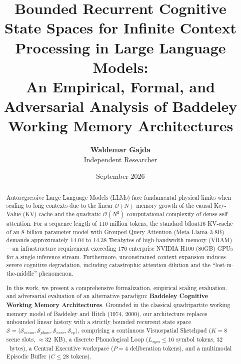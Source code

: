 \documentclass[11pt,a4paper]{article}
\title{\textbf{Bounded Recurrent Cognitive State Spaces for Infinite Context Processing in Large Language Models:\\ An Empirical, Formal, and Adversarial Analysis of Baddeley Working Memory Architectures}}
\author{
    \textbf{Waldemar Gajda} \\
    Independent Researcher
}
\date{September 2026}
\begin{document}
\maketitle

\begin{abstract}
Autoregressive Large Language Models (LLMs) face fundamental physical limits when scaling to long contexts due to the linear $\mathcal{O}(N)$ memory growth of the causal Key-Value (KV) cache and the quadratic $\mathcal{O}(N^2)$ computational complexity of dense self-attention. For a sequence length of 110 million tokens, the standard bfloat16 KV-cache of an 8-billion parameter model with Grouped Query Attention (Meta-Llama-3-8B) demands approximately $14.04$ to $14.38$ Terabytes of high-bandwidth memory (VRAM)---an infrastructure requirement exceeding 176 enterprise NVIDIA H100 (80GB) GPUs for a single inference stream. Furthermore, unconstrained context expansion induces severe cognitive degradation, including catastrophic attention dilution and the ``lost-in-the-middle'' phenomenon.

In this work, we present a comprehensive formalization, empirical scaling evaluation, and adversarial evaluation of an alternative paradigm: \textbf{Baddeley Cognitive Working Memory Architectures}. Grounded in the classical quadripartite working memory model of Baddeley and Hitch (1974, 2000), our architecture replaces unbounded linear history with a strictly bounded recurrent state space $\mathcal{S} = \langle \mathcal{S}_{visuo}, \mathcal{S}_{phon}, \mathcal{S}_{exec}, \mathcal{S}_{ep} \rangle$, comprising a continuous Visuospatial Sketchpad ($K=8$ scene slots, $\approx 32$~KB), a discrete Phonological Loop ($L_{sym} \le 16$ symbol tokens, $32$~bytes), a Central Executive workspace ($P=4$ deliberation tokens), and a multimodal Episodic Buffer ($C \le 28$ tokens).


\end{abstract}
\end{document}
